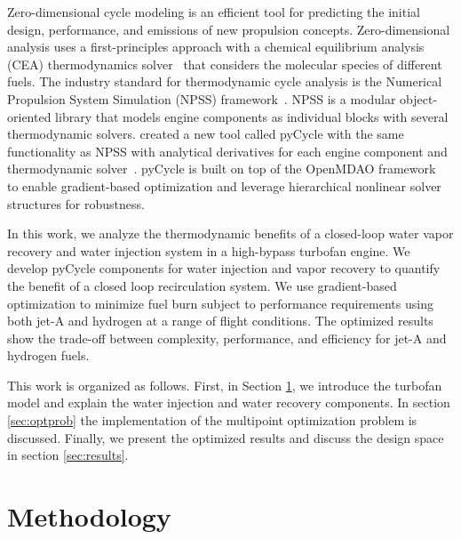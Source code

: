 \documentclass[conf]{new-aiaa}
\begin{document}
Zero-dimensional cycle modeling is an efficient tool for predicting the initial design, performance, and emissions of new propulsion concepts.
Zero-dimensional analysis uses a first-principles approach with a chemical equilibrium analysis (CEA) thermodynamics solver~\cite{Gordon1994} that considers the molecular species of different fuels.
The industry standard for thermodynamic cycle analysis is the Numerical Propulsion System Simulation (NPSS) framework~\cite{JonesNPSS}.
NPSS is a modular object-oriented library that models engine components as individual blocks with several thermodynamic solvers.
\citet{Hendricks2019} created a new tool called pyCycle with the same functionality as NPSS with analytical derivatives for each engine component and thermodynamic solver~\cite{Gray2017b}.
pyCycle is built on top of the OpenMDAO framework~\cite{Gray2019a} to enable gradient-based optimization and leverage hierarchical nonlinear solver structures for robustness.

In this work, we analyze the thermodynamic benefits of a closed-loop water vapor recovery and water injection system in a high-bypass turbofan engine.
We develop pyCycle components for water injection and vapor recovery to quantify the benefit of a closed loop recirculation system.
We use gradient-based optimization to minimize fuel burn subject to performance requirements using both jet-A and hydrogen at a range of flight conditions.
The optimized results show the trade-off between complexity, performance, and efficiency for jet-A and hydrogen fuels.

This work is organized as follows. First, in Section \ref{sec:method}, we introduce the turbofan model and explain the water injection and water recovery components.
In section \ref{sec:optprob} the implementation of the multipoint optimization problem is discussed.
Finally, we present the optimized results and discuss the design space in section \ref{sec:results}.

\section{Methodology}
\label{sec:method}
\end{document}
